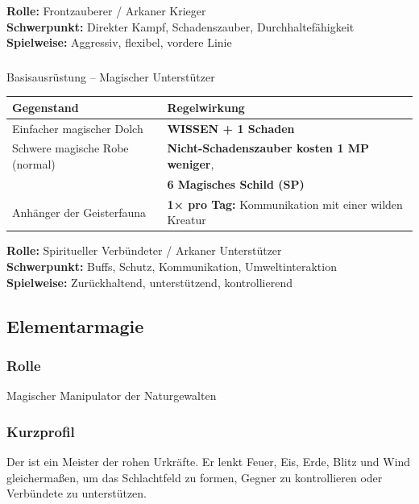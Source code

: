 \textbf{Rolle:} Frontzauberer / Arkaner Krieger\\  
\textbf{Schwerpunkt:} Direkter Kampf, Schadenszauber, Durchhaltefähigkeit\\  
\textbf{Spielweise:} Aggressiv, flexibel, vordere Linie

\subsubsection*{}

\begin{rulebox}{Basisausrüstung – Magischer Unterstützer}
	\begin{tabular}{lp{9cm}}
		\toprule
		\textbf{Gegenstand} & \textbf{Regelwirkung} \\
		\midrule
		Einfacher magischer Dolch &
		\textbf{WISSEN + 1 Schaden} \\
		
		Schwere magische Robe (normal) &
		\textbf{Nicht-Schadenszauber kosten 1 MP weniger}, \\
		& \textbf{6 Magisches Schild (SP)} \\
		
		Anhänger der Geisterfauna &
		\textbf{1× pro Tag:}
		Kommunikation mit einer wilden Kreatur \\
		
		\bottomrule
	\end{tabular}
\end{rulebox}

\textbf{Rolle:} Spiritueller Verbündeter / Arkaner Unterstützer\\  
\textbf{Schwerpunkt:} Buffs, Schutz, Kommunikation, Umweltinteraktion\\  
\textbf{Spielweise:} Zurückhaltend, unterstützend, kontrollierend

\subsection{Elementarmagie}

\subsubsection*{Rolle}
Magischer Manipulator der Naturgewalten

\subsubsection*{Kurzprofil}
Der  ist ein Meister der rohen Urkräfte.
Er lenkt Feuer, Eis, Erde, Blitz und Wind gleichermaßen, um das Schlachtfeld zu formen,
Gegner zu kontrollieren oder Verbündete zu unterstützen.

